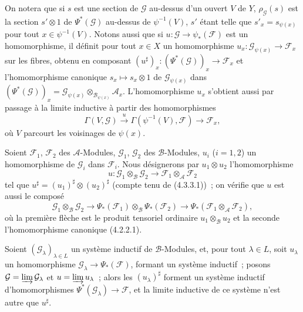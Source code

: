 \begin{env}[4.4.3]
On notera que si $s$ est une section de $\mathcal{G}$ au-dessus d'un ouvert
$V$ de $Y$, $\rho_{\mathcal{G}}(s)$ est la section $s'\otimes1$ de
$\Psi^*(\mathcal{G})$ au-dessus de $\psi^{-1}(V)$, $s'$ étant telle que
$s'_x=s_{\psi(x)}$ pour tout $x\in\psi^{-1}(V)$. Notons aussi que si
$u:\mathcal{G}\to\psi_*(\mathcal{F})$ est un homomorphisme, il définit pour
tout $x\in X$ un homomorphisme
$u_x:\mathcal{G}_{\psi(x)}\to\mathcal{F}_x$ sur les fibres, obtenu en
composant
$(u^\sharp)_x:(\Psi^*(\mathcal{G}))_x\to\mathcal{F}_x$ et l'homomorphisme
canonique $s_x\mapsto s_x\otimes1$ de $\mathcal{G}_{\psi(x)}$ dans
$(\Psi^*(\mathcal{G}))_x
=\mathcal{G}_{\psi(x)}\otimes_{\mathcal{B}_{\psi(x)}}\mathcal{A}_x$.
L'homomorphisme $u_x$ s'obtient aussi par passage à la limite inductive à
partir des homomorphismes
\[
  \Gamma(V,\mathcal{G})\xrightarrow{u}
  \Gamma(\psi^{-1}(V),\mathcal{F})\longrightarrow\mathcal{F}_x,
\]
où $V$ parcourt les voisinages de $\psi(x)$.
\end{env}

\begin{env}[4.4.4]
\label{0.4.4.4-fr}
Soient $\mathcal{F}_1$, $\mathcal{F}_2$ des $\mathcal{A}$-Modules,
$\mathcal{G}_1$, $\mathcal{G}_2$ des $\mathcal{B}$-Modules, $u_i$ ($i=1,2$)
un homomorphisme de $\mathcal{G}_i$ dans $\mathcal{F}_i$. Nous désignerons par
$u_1\otimes u_2$ l'homomorphisme
\[
  u:\mathcal{G}_1\otimes_{\mathcal{B}}\mathcal{G}_2
  \longrightarrow
  \mathcal{F}_1\otimes_{\mathcal{A}}\mathcal{F}_2
\]
tel que $u^\sharp=(u_1)^\sharp\otimes(u_2)^\sharp$ (compte tenu de
(4.3.3.1))~; on vérifie que $u$ est aussi le composé
\[
  \mathcal{G}_1\otimes_{\mathcal{B}}\mathcal{G}_2
  \longrightarrow
  \Psi_*(\mathcal{F}_1)\otimes_{\mathcal{B}}\Psi_*(\mathcal{F}_2)
  \longrightarrow
  \Psi_*(\mathcal{F}_1\otimes_{\mathcal{A}}\mathcal{F}_2),
\]
où la première flèche est le produit tensoriel ordinaire
$u_1\otimes_{\mathcal{B}}u_2$ et la seconde l'homomorphisme canonique
(4.2.2.1).
\end{env}

\begin{env}[4.4.5]
\label{0.4.4.5-fr}
Soient $(\mathcal{G}_\lambda)_{\lambda\in L}$ un système inductif de
$\mathcal{B}$-Modules, et, pour tout $\lambda\in L$, soit $u_\lambda$ un
homomorphisme $\mathcal{G}_\lambda\to\Psi_*(\mathcal{F})$, formant un système
inductif~; posons
$\mathcal{G}=\varinjlim\mathcal{G}_\lambda$ et
$u=\varinjlim u_\lambda$~; alors les $(u_\lambda)^\sharp$ forment un système
inductif d'homomorphismes $\Psi^*(\mathcal{G}_\lambda)\to\mathcal{F}$, et la
limite inductive de ce système n'est autre que $u^\sharp$.
\end{env}

